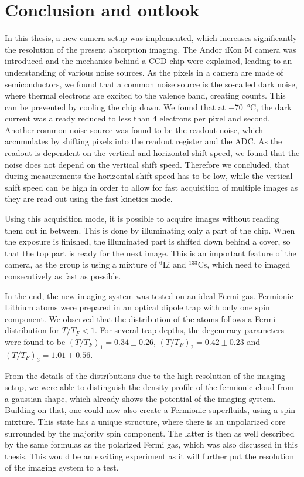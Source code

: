 \chapter{Conclusion and outlook}

In this thesis, a new camera setup was implemented, which increases significantly the resolution of the present absorption imaging. The Andor iKon M camera was introduced and the mechanics behind a CCD chip were explained, leading to an understanding of various noise sources. As the pixels in a camera are made of semiconductors, we found that a common noise source is the so-called dark noise, where thermal electrons are excited to the valence band, creating counts. This can be prevented by cooling the chip down. We found that at \SI{-70}{\degreeCelsius}, the dark current was already reduced to less than 4 electrons per pixel and second. Another common noise source was found to be the readout noise, which accumulates by shifting pixels into the readout register and the ADC.
As the readout is dependent on the vertical and horizontal shift speed, we found that the noise does not depend on the vertical shift speed. Therefore we concluded, that during measurements the horizontal shift speed has to be low, while the vertical shift speed can be high in order to allow for fast acquisition of multiple images as they are read out using the fast kinetics mode.

Using this acquisition mode, it is possible to acquire images without reading them out in between. This is done by illuminating only a part of the chip. When the exposure is finished, the illuminated part is shifted down behind a cover, so that the top part is ready for the next image. This is an important feature of the camera, as the group is using a mixture of $^6$Li and $^{133}$Cs, which need to imaged consecutively as fast as possible.

In the end, the new imaging system was tested on an ideal Fermi gas. Fermionic Lithium atoms were prepared in an optical dipole trap with only one spin component. We observed that the distribution of the atoms follows a Fermi-distribution for $T/T_F < 1$. For several trap depths, the degeneracy parameters were found to be $(T/T_F)_1 = 0.34\pm0.26$, $(T/T_F)_2 = 0.42\pm0.23$ and $(T/T_F)_3 = 1.01\pm0.56$.

From the details of the distributions due to the high resolution of the imaging setup, we were able to distinguish the density profile of the fermionic cloud from a gaussian shape, which already shows the potential of the imaging system. Building on that, one could now also create a Fermionic superfluids, using a spin mixture. This state has a unique structure, where there is an unpolarized core surrounded by the majority spin component\cite{Shin2006,Zwierlein2006b}. The latter is then as well described by the same formulas as the polarized Fermi gas, which was also discussed in this thesis. This would be an exciting experiment as it will further put the resolution of the imaging system to a test.
